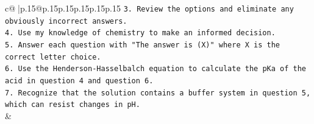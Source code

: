 \documentclass{article}
\begin{document}
{\begin{supertabular}{c@{$\;$}|p{.15\linewidth}@{}p{.15\linewidth}p{.15\linewidth}p{.15\linewidth}p{.15\linewidth}p{.15\linewidth}}
{{{\texttt{3. Review the options and eliminate any obviously incorrect answers.} \\
\texttt{4. Use my knowledge of chemistry to make an informed decision.} \\
\texttt{5. Answer each question with "The answer is (X)" where X is the correct letter choice.} \\
\texttt{6. Use the Henderson{-}Hasselbalch equation to calculate the pKa of the acid in question 4 and question 6.} \\
\texttt{7. Recognize that the solution contains a buffer system in question 5, which can resist changes in pH.} \\
            }
        }
    }
    & \\ \\

\end{supertabular}
}
\end{document}
